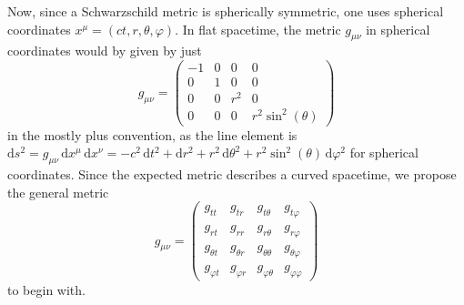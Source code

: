 \documentclass[a4paper,11pt]{article}
\numberwithin{equation}{section}
\begin{document}
{Now, since a Schwarzschild metric is spherically symmetric, one uses spherical coordinates $x^\mu = (ct, r, \theta,\varphi)$. In flat spacetime, the metric $g_{\mu\nu}$ in spherical coordinates would by given by just \begin{equation}
	g_{\mu\nu} = \begin{pmatrix}
		-1 & 0 & 0 & 0 \\
		0 & 1 & 0 & 0 \\
		0 & 0 & r^2 & 0 \\
		0 & 0 & 0 & r^2\sin^2(\theta)
	\end{pmatrix}
\end{equation} in the mostly plus convention, as the line element is $\mathrm{d}s^2 = g_{\mu\nu}\,\mathrm{d}x^\mu\,\mathrm{d}x^\nu = -c^2\,\mathrm{d}t^2 + \mathrm{d}r^2 + r^2\,\mathrm{d}\theta^2 + r^2\sin^2(\theta)\,\mathrm{d}\varphi^2$ for spherical coordinates. Since the expected metric describes a curved spacetime, we propose the general metric \begin{equation}
	g_{\mu\nu} = \begin{pmatrix}
		g_{tt} & g_{tr} & g_{t\theta} & g_{t\varphi} \\
		g_{rt} & g_{rr} & g_{r\theta} & g_{r\varphi} \\
		g_{\theta t} & g_{\theta r} & g_{\theta\theta} & g_{\theta\varphi} \\
		g_{\varphi t} & g_{\varphi r} & g_{\varphi \theta} & g_{\varphi\varphi}
	\end{pmatrix}
\end{equation} to begin with.

}
\end{document}
